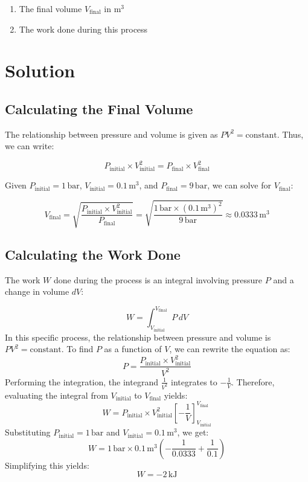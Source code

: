 \documentclass[12pt]{article}
\begin{document}
\begin{enumerate}
    \item The final volume \( V_{\text{final}} \) in \( \text{m}^3 \)
    \item The work done during this process
\end{enumerate}

\section*{Solution}

\subsection*{Calculating the Final Volume}

The relationship between pressure and volume is given as \( PV^2 = \text{constant} \). Thus, we can write:

\[
P_{\text{initial}} \times V_{\text{initial}}^2 = P_{\text{final}} \times V_{\text{final}}^2
\]

Given \( P_{\text{initial}} = 1 \, \text{bar} \), \( V_{\text{initial}} = 0.1 \, \text{m}^3 \), and \( P_{\text{final}} = 9 \, \text{bar} \), we can solve for \( V_{\text{final}} \):

\[
V_{\text{final}} = \sqrt{\frac{P_{\text{initial}} \times V_{\text{initial}}^2}{P_{\text{final}}}} = \sqrt{\frac{1 \, \text{bar} \times (0.1 \, \text{m}^3)^2}{9 \, \text{bar}}} \approx 0.0333 \, \text{m}^3
\]
\subsection*{Calculating the Work Done}

The work \( W \) done during the process is an integral involving pressure \( P \) and a change in volume \( dV \):

\[
W = \int_{V_{\text{initial}}}^{V_{\text{final}}} P \, dV
\]
In this specific process, the relationship between pressure and volume is \( PV^2 = \text{constant} \). To find \( P \) as a function of \( V \), we can rewrite the equation as:
\[
P = \frac{P_{\text{initial}} \times V_{\text{initial}}^2}{V^2}
\]
Performing the integration, the integrand \(\frac{1}{V^2}\) integrates to \(-\frac{1}{V}\). Therefore, evaluating the integral from \( V_{\text{initial}} \) to \( V_{\text{final}} \) yields:
\[
W = P_{\text{initial}} \times V_{\text{initial}}^2 \left[ -\frac{1}{V} \right]_{V_{\text{initial}}}^{V_{\text{final}}}
\]
Substituting \( P_{\text{initial}} = 1 \, \text{bar} \) and \( V_{\text{initial}} = 0.1 \, \text{m}^3 \), we get:
\[
W = 1 \, \text{bar} \times 0.1 \, \text{m}^3 \left( -\frac{1}{0.0333} + \frac{1}{0.1} \right)
\]
Simplifying this yields:
\[
W = -2 \, \text{kJ}
\]
\end{document}
